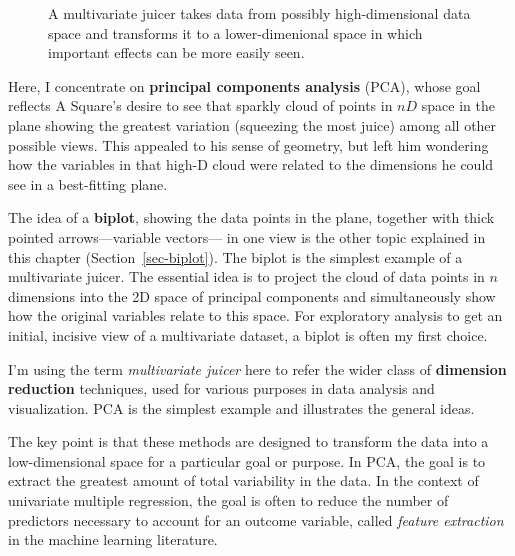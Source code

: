 \documentclass[
  letterpaper,
  10pt,
  krantz2]{krantz}
\begin{document}
{\begin{figure}
{}

\caption{\label{fig-MV-juicer}A multivariate juicer takes data from
possibly high-dimensional data space and transforms it to a
lower-dimenional space in which important effects can be more easily
seen.}

\end{figure}%

Here, I concentrate on \textbf{principal components analysis} (PCA),
whose goal reflects A Square's desire to see that sparkly cloud of
points in \(nD\) space in the plane showing the greatest variation
(squeezing the most juice) among all other possible views. This appealed
to his sense of geometry, but left him wondering how the variables in
that high-D cloud were related to the dimensions he could see in a
best-fitting plane.

The idea of a \textbf{biplot}, showing the data points in the plane,
together with thick pointed arrows---variable vectors--- in one view is
the other topic explained in this chapter (Section~\ref{sec-biplot}).
The biplot is the simplest example of a multivariate juicer. The
essential idea is to project the cloud of data points in \(n\)
dimensions into the 2D space of principal components and simultaneously
show how the original variables relate to this space. For exploratory
analysis to get an initial, incisive view of a multivariate dataset, a
biplot is often my first choice.

\begin{tcolorbox}[enhanced jigsaw, colback=white, titlerule=0mm, toprule=.15mm, opacityback=0, leftrule=.75mm, opacitybacktitle=0.6, left=2mm, arc=.35mm, colframe=quarto-callout-note-color-frame, breakable, bottomtitle=1mm, toptitle=1mm, title=\textcolor{quarto-callout-note-color}{\faInfo}\hspace{0.5em}{Looking ahead}, rightrule=.15mm, bottomrule=.15mm, coltitle=black, colbacktitle=quarto-callout-note-color!10!white]

I'm using the term \emph{multivariate juicer} here to refer the wider
class of \textbf{dimension reduction} techniques, used for various
purposes in data analysis and visualization. PCA is the simplest example
and illustrates the general ideas.

The key point is that these methods are designed to transform the data
into a low-dimensional space for a particular goal or purpose. In PCA,
the goal is to extract the greatest amount of total variability in the
data. In the context of univariate multiple regression, the goal is
often to reduce the number of predictors necessary to account for an
outcome variable, called \emph{feature extraction} in the machine
learning literature.


\end{tcolorbox}}
\end{document}
